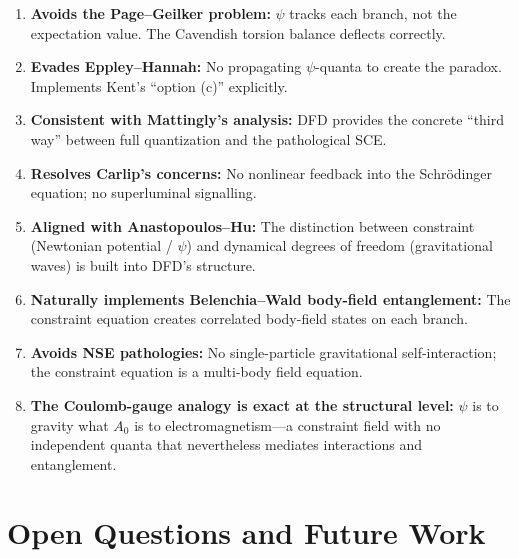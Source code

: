\documentclass[12pt,a4paper]{article}
\begin{document}
\begin{enumerate}
\item \textbf{Avoids the Page--Geilker problem:} $\psi$ tracks each branch, not the expectation value. The Cavendish torsion balance deflects correctly.

\item \textbf{Evades Eppley--Hannah:} No propagating $\psi$-quanta to create the paradox. Implements Kent's ``option (c)'' explicitly.

\item \textbf{Consistent with Mattingly's analysis:} DFD provides the concrete ``third way'' between full quantization and the pathological SCE.

\item \textbf{Resolves Carlip's concerns:} No nonlinear feedback into the Schr\"odinger equation; no superluminal signalling.

\item \textbf{Aligned with Anastopoulos--Hu:} The distinction between constraint (Newtonian potential / $\psi$) and dynamical degrees of freedom (gravitational waves) is built into DFD's structure.

\item \textbf{Naturally implements Belenchia--Wald body-field entanglement:} The constraint equation creates correlated body-field states on each branch.

\item \textbf{Avoids NSE pathologies:} No single-particle gravitational self-interaction; the constraint equation is a multi-body field equation.

\item \textbf{The Coulomb-gauge analogy is exact at the structural level:} $\psi$ is to gravity what $A_0$ is to electromagnetism---a constraint field with no independent quanta that nevertheless mediates interactions and entanglement.
\end{enumerate}


\section{Open Questions and Future Work}
\label{sec:open-questions}
\end{document}
